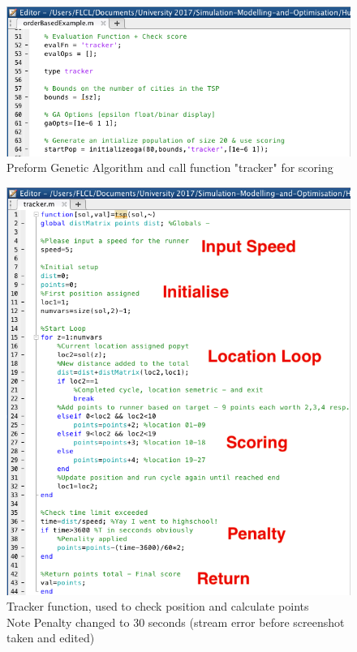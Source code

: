 \documentclass[a4paper, 10pt]{IEEEconf}
\begin{document}
\begin{figure}[H]
  \includegraphics[width=\linewidth, center]{images/scoring}
  \caption{Preform Genetic Algorithm and call function "tracker" for scoring}
  \label{fig:Preform Genetic Algorithm and call function "tracker" for scoring}
\end{figure}

\begin{figure}[H]
  \includegraphics[width=\linewidth, center]{images/tracker}
  \caption{Tracker function, used to check position and calculate points \\ Note Penalty changed to 30 seconds (stream error before screenshot taken and edited)}
  \label{fig:Tracker function, used to check position and calculate points}
\end{figure}
\end{document}
